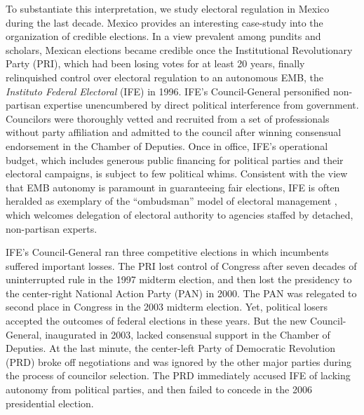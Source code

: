 \documentclass[12 pt, letter]{article}
\renewcommand{\footnote}{\endnote}
\begin{document}
To substantiate this interpretation, we study electoral regulation
in Mexico during the last decade.  Mexico provides an interesting
case-study into the organization of credible elections.  In a view
prevalent among pundits and scholars, Mexican elections became
credible once the Institutional Revolutionary Party (PRI), which had
been losing votes for at least 20 years, finally relinquished
control over electoral regulation to an autonomous EMB, the
\emph{Instituto Federal Electoral} (IFE) in 1996. IFE's
Council-General personified non-partisan expertise unencumbered by
direct political interference from government. Councilors were
thoroughly vetted and recruited from a set of professionals without
party affiliation and admitted to the council after winning
consensual endorsement in the Chamber of Deputies. Once in office,
IFE's operational budget, which includes generous public financing
for political parties and their electoral campaigns, is subject to
few political whims.  Consistent with the view that EMB autonomy is
paramount in guaranteeing fair elections, IFE is often heralded as
exemplary of the ``ombudsman'' model of electoral management
\citep{Eisenstadt2004}, which welcomes delegation of electoral
authority to agencies staffed by detached, non-partisan experts.

IFE's Council-General ran three competitive elections in which
incumbents suffered important losses. The PRI lost control of
Congress after seven decades of uninterrupted rule in the 1997
midterm election, and then lost the presidency to the center-right
National Action Party (PAN) in 2000. The PAN was relegated to second
place in Congress in the 2003 midterm election. Yet, political
losers accepted the outcomes of federal elections in these years.
But the new Council-General, inaugurated in 2003, lacked consensual
support in the Chamber of Deputies.  At the last minute, the
center-left Party of Democratic Revolution (PRD) broke off
negotiations and was ignored by the other major parties during the
process of  councilor selection.  The PRD immediately accused IFE of
lacking autonomy from political parties, and then failed to concede
in the 2006 presidential election.

\end{document}
